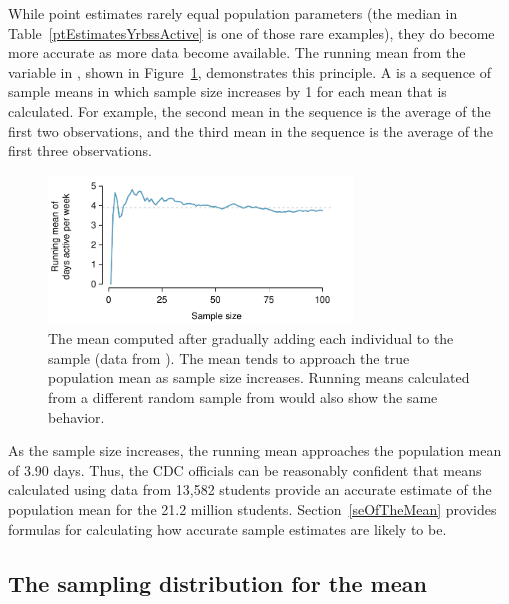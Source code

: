 \begin{spacing}{1.5}
While point estimates rarely equal population parameters (the median in Table~\ref{ptEstimatesYrbssActive} is one of those rare examples), they do become more accurate as more data become available. The running mean from the variable  in , shown in Figure~\ref{yrbssActiveRunningMean}, demonstrates this principle. A  is a sequence of sample means in which sample size increases by 1 for each mean that is calculated. For example, the second mean in the sequence is the average of the first two observations, and the third mean in the sequence is the average of the first three observations. 

\begin{figure}[h]
	\centering
	\includegraphics[width=0.72\textwidth]{ch_inference_foundations_oi_biostat/figures/yrbssActiveRunningMean/yrbssActiveRunningMean}
	\caption{The mean computed after gradually adding each individual to the sample (data from ). The mean tends to approach the true population mean as sample size increases. Running means calculated from a different random sample from  would also show the same behavior.}
	\label{yrbssActiveRunningMean}
\end{figure}

As the sample size increases, the running mean approaches the population mean of 3.90 days. Thus, the CDC officials can be reasonably confident that means calculated using data from 13,582 students provide an accurate estimate of the population mean for the 21.2 million students.  Section~\ref{seOfTheMean} provides formulas for calculating how accurate sample estimates are likely to be.

\subsection{The sampling distribution for the mean}


\end{spacing}
